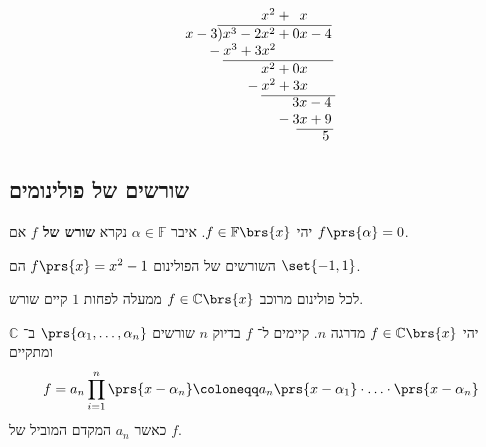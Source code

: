 \documentclass[article, 10pt,oneside]{article}
\renewcommand{\emph}[1]{\textbf{#1}}
\begin{document}
\begin{algorithm}
\begin{enumerate}
\begin{otherlanguage}{english}
\[
\begin{array}{l}
{\hphantom{x-3) x^3 - 2}}x^2 + \hphantom{0} x\\
x-3\overline{) x^3 - 2x^2 + 0x - 4} \\
\hphantom{x-3} \hspace{-8pt} -x^3 + 3x^2 \\
\hphantom{x-3)} \overline{\hphantom{x^3 -3 } x^2 + 0x \hphantom{-4..}}
\\
\hphantom{x-3)} \hphantom{x^3 -3 } \hspace{-12pt} -x^2 + 3x
\\
\hphantom{x-3 ) x^3 + 2}\overline{\hphantom{x^2 +. \hspace{-3pt}} 3x - 4 \hphantom{.}}
\\
\hphantom{x-3 ) x^3 + 2}{\hphantom{x^2 +. \hspace{-3pt}} \hspace{-12pt} -3x + 9 \hphantom{.}}
\\
\hphantom{x-3 ) x^3 - 2x^2 + .} \overline{\hphantom{3x -} 5 \hphantom{.}}
\end{array}
\]
\end{otherlanguage}


\end{enumerate}
\end{algorithm}

\subsection*{שורשים של פולינומים}

\begin{definition}
יהי
$f \in \mathbb{F}\brs{x}$.
איבר
$\alpha \in \mathbb{F}$
נקרא
\emph{
שורש של
$f$
}
אם
$f\prs{\alpha} = 0$.
\end{definition}

\begin{example}
השורשים של הפולינום
$f\prs{x} = x^2 - 1$
הם
$\set{-1,1}$.
\end{example}

\begin{theorem}
לכל
פולינום מרוכב
$f \in \mathbb{C}\brs{x}$
ממעלה לפחות
$1$
קיים שורש.
\end{theorem}

\begin{corollary}
יהי
$f \in \mathbb{C}\brs{x}$
מדרגה
$n$.
קיימים ל־%
$f$
בדיוק
$n$
שורשים
$\prs{\alpha_1, \ldots, \alpha_n}$
ב־%
$\mathbb{C}$
ומתקיים
\[f = a_n \prod_{i = 1}^n \prs{x - \alpha_n} \coloneqq a_n \prs{x - \alpha_1} \cdot \ldots \cdot \prs{x - \alpha_n}\]
כאשר
$a_n$
המקדם המוביל של
$f$.
\end{corollary}
\end{document}

